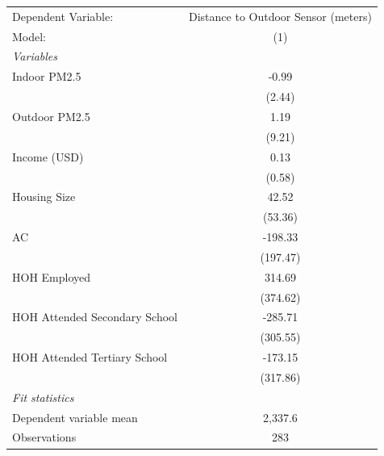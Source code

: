 
\begin{tabular}{lc}
   \toprule
   Dependent Variable:           & Distance to Outdoor Sensor (meters)\\  
   Model:                        & (1)\\  
   \midrule
   \emph{Variables}\\
   Indoor PM2.5                  & -0.99\\   
                                 & (2.44)\\   
   Outdoor PM2.5                 & 1.19\\   
                                 & (9.21)\\   
   Income (USD)                  & 0.13\\   
                                 & (0.58)\\   
   Housing Size                  & 42.52\\   
                                 & (53.36)\\   
   AC                            & -198.33\\   
                                 & (197.47)\\   
   HOH Employed                  & 314.69\\   
                                 & (374.62)\\   
   HOH Attended Secondary School & -285.71\\   
                                 & (305.55)\\   
   HOH Attended Tertiary School  & -173.15\\   
                                 & (317.86)\\   
   \midrule
   \emph{Fit statistics}\\
   Dependent variable mean       & 2,337.6\\  
   Observations                  & 283\\  
   \bottomrule
\end{tabular}


